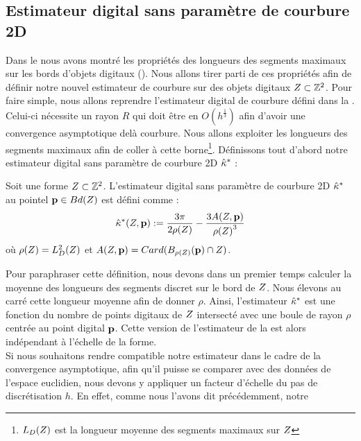 \subsection{Estimateur digital sans paramètre de courbure 2D}
%
Dans le  nous avons montré les propriétés des longueurs
des segments maximaux sur les bords d'objets digitaux
(). Nous allons tirer parti de ces propriétés afin
de définir notre nouvel estimateur de courbure sur des objets digitaux
$Z \subset \mathbb{Z}^2$. Pour faire simple, nous allons reprendre l'estimateur
digital de courbure défini dans la .
Celui-ci nécessite un rayon $R$ qui doit être en $O(h^{\frac{1}{3}})$ afin
d'avoir une convergence asymptotique delà courbure. Nous allons exploiter les
longueurs des segments maximaux afin de coller à cette
borne\footnote{$L_D({Z})$ est la longueur moyenne des segments maximaux
sur $Z$}. Définissons tout d'abord notre estimateur digital sans
paramètre de courbure 2D $\hat{\kappa}^{*}$ :
%
\begin{definition}
  \label{def:curvature-estimator-2d-pf}
  Soit une forme $Z \subset \mathbb{Z}^2$. L'estimateur digital sans paramètre
  de courbure 2D $\hat{\kappa}^{*}$ au pointel $\mathbf{p} \in Bd({Z})$ est défini comme :
  \begin{equation}
    \hat{\kappa}^{*}( Z, \mathbf{p}) := \frac{3\pi}{2 \rho(Z)} - \frac{3 A(Z,\mathbf{p})}{{\rho(Z)}^3}
  \end{equation}
  où $\rho(Z) =L_D^2(Z)$ et $A(Z,\mathbf{p}) =
  Card(B_{\rho(Z)}(\mathbf{p}) \cap Z)$.
\end{definition}
%
%
Pour paraphraser cette définition, nous devons dans un premier temps calculer la
moyenne des longueurs des segments discret sur le bord de $Z$. Nous
élevons au carré cette longueur moyenne afin de donner $\rho$. Ainsi,
l'estimateur $\hat{\kappa}^{*}$ est une fonction du nombre de points digitaux de
$Z$ intersecté avec une boule de rayon $\rho$ centrée au point digital
$\mathbf{p}$. Cette version de l'estimateur de la
 est alors indépendant à l’échelle de la
forme.
%
\\
%
Si nous souhaitons rendre compatible notre estimateur dans le cadre de la
convergence asymptotique, afin qu'il puisse se comparer avec des données de
l'espace euclidien, nous devons y appliquer un facteur d'échelle du pas de
discrétisation $h$. En effet, comme nous l'avons dit précédemment, notre
